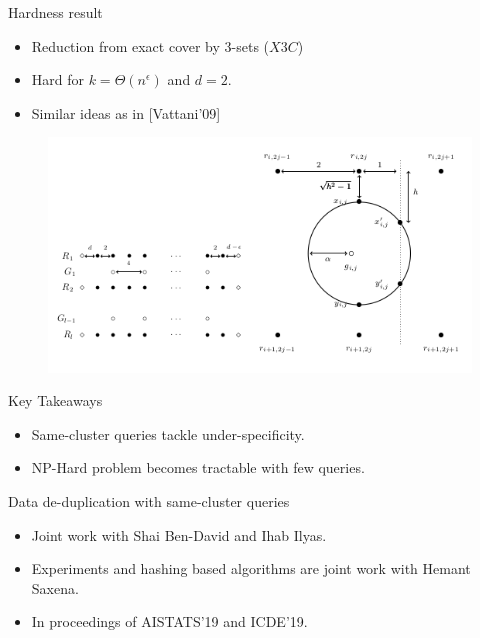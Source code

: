 \documentclass{beamer}
\begin{document}
\begin{frame}{Hardness result}
	\begin{itemize}
		\item Reduction from exact cover by $3$-sets ($X3C$)
		\item Hard for $k = \Theta(n^\epsilon)$ and $d = 2$.
		\item Similar ideas as in \alert{[Vattani'09]}
	\end{itemize}
	
	\begin{figure}
		\centering
		\includegraphics[trim=0 0 0 0,scale=0.5]{figures/hardnessFig.png}
	\end{figure}
\end{frame}

\begin{frame}{Key Takeaways}
	
	\begin{itemize}
		\item Same-cluster queries tackle under-specificity.
		\vspace{30pt}\item NP-Hard problem becomes {\color{blue}tractable with few queries}. 
	\end{itemize}
\end{frame}


\begin{frame}{Data de-duplication with same-cluster queries}
	\begin{itemize}
		\item Joint work with Shai Ben-David and Ihab Ilyas.
		\vspace{20pt}\item Experiments and hashing based algorithms are joint work with Hemant Saxena.		
		\vspace{20pt} \item In proceedings of \alert{AISTATS'19} and \alert{ICDE'19}.
	\end{itemize}
\end{frame}
\end{document}
